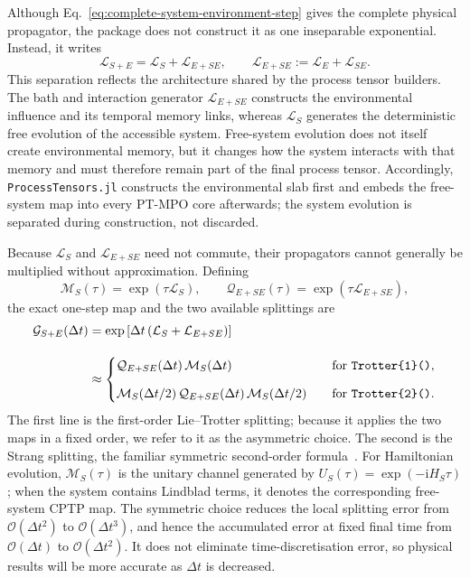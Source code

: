 Although Eq.~\eqref{eq:complete-system-environment-step} gives the complete physical propagator, the package does not construct it as one inseparable exponential.
Instead, it writes
%
\begin{equation}
    \mathcal L_{S+E}
    = \mathcal L_S+\mathcal L_{E+SE}, \qquad \mathcal L_{E+SE}
    := \mathcal L_E+\mathcal L_{SE}.
    \label{eq:system-environment-generator-separation}
\end{equation}
%
This separation reflects the architecture shared by the process tensor builders.
The bath and interaction generator \(\mathcal L_{E+SE}\) constructs the environmental influence and its temporal memory links, whereas \(\mathcal L_S\) generates the deterministic free evolution of the accessible system.
Free-system evolution does not itself create environmental memory, but it changes how the system interacts with that memory and must therefore remain part of the final process tensor.
Accordingly, \texttt{ProcessTensors.jl} constructs the environmental slab first and embeds the free-system map into every PT-MPO core afterwards; the system evolution is separated during construction, not discarded.

Because \(\mathcal L_S\) and \(\mathcal L_{E+SE}\) need not commute, their propagators cannot generally be multiplied without approximation.
Defining
%
\begin{equation}
    \mathcal M_S(\tau)
    = \exp(\tau\mathcal L_S), \qquad \mathcal Q_{E+SE}(\tau)
    = \exp(\tau\mathcal L_{E+SE}),
\end{equation}
%
the exact one-step map and the two available splittings are
%
\begin{equation}
    \begin{aligned}
    \mathcal G_{S+E}(\Delta t)
    &= \exp \left[ \Delta t \left( \mathcal L_S+\mathcal L_{E+SE} \right) \right] \\[1em]
    &\approx
    \begin{cases}
        \mathcal Q_{E+SE}(\Delta t)\, \mathcal M_S(\Delta t)
        &\quad \text{for \texttt{Trotter\{1\}()}}, \\[0.8em] \mathcal M_S(\Delta t/2)\, \mathcal Q_{E+SE}(\Delta t)\, \mathcal M_S(\Delta t/2)
        &\quad \text{for \texttt{Trotter\{2\}()}}.
    \end{cases}
    \end{aligned}
    \label{eq:system-bath-splitting}
\end{equation}
%
The first line is the first-order Lie--Trotter splitting; because it applies the two maps in a fixed order, we refer to it as the asymmetric choice.
The second is the Strang splitting, the familiar symmetric second-order formula~\cite{Trotter1959,Strang1968}.
For Hamiltonian evolution, \(\mathcal M_S(\tau)\) is the unitary channel generated by \(U_S(\tau)=\exp(-\mathrm{i}H_S\tau)\); when the system contains Lindblad terms, it denotes the corresponding free-system CPTP map.
The symmetric choice reduces the local splitting error from \(\mathcal O(\Delta t^2)\) to \(\mathcal O(\Delta t^3)\), and hence the accumulated error at fixed final time from \(\mathcal O(\Delta t)\) to \(\mathcal O(\Delta t^2)\).
It does not eliminate time-discretisation error, so physical results will be more accurate as \(\Delta t\) is decreased.

